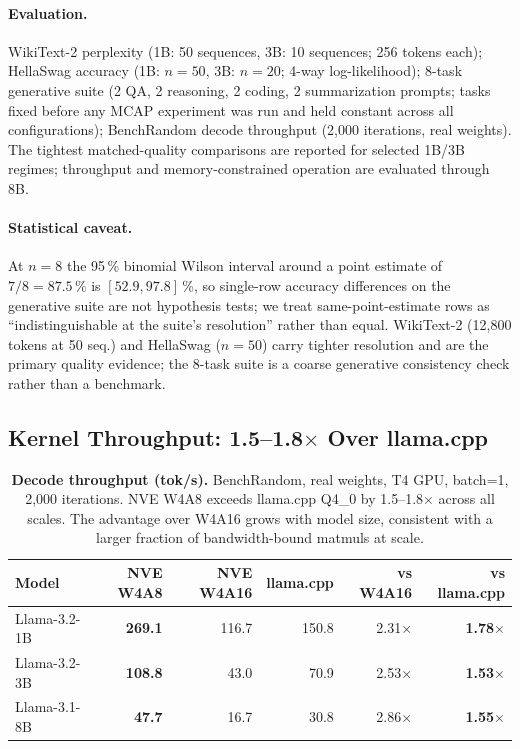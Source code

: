 \documentclass{article}
\begin{document}
\paragraph{Evaluation.}
WikiText-2 perplexity (1B: 50 sequences, 3B: 10 sequences; 256 tokens each);
HellaSwag accuracy (1B: $n=50$, 3B: $n=20$; 4-way log-likelihood);
8-task generative suite (2 QA, 2 reasoning, 2 coding, 2 summarization prompts; tasks
fixed before any MCAP experiment was run and held constant across all configurations);
BenchRandom decode throughput (2,000 iterations, real weights). The tightest
matched-quality comparisons are reported for selected 1B/3B regimes; throughput
and memory-constrained operation are evaluated through 8B.

\paragraph{Statistical caveat.} At $n=8$ the 95\,\% binomial Wilson interval around a
point estimate of $7/8 = 87.5\,\%$ is $[52.9, 97.8]$\,\%, so single-row accuracy
differences on the generative suite are not hypothesis tests; we treat
same-point-estimate rows as ``indistinguishable at the suite's resolution'' rather than
equal. WikiText-2 (12,800 tokens at 50 seq.) and HellaSwag ($n=50$) carry tighter
resolution and are the primary quality evidence; the 8-task suite is a coarse generative
consistency check rather than a benchmark.


\subsection{Kernel Throughput: 1.5--1.8$\times$ Over llama.cpp}
\label{sec:throughput}

\begin{table}[H]
\centering
\caption{\textbf{Decode throughput (tok/s).} BenchRandom, real weights, T4
GPU, batch=1, 2,000 iterations. NVE W4A8 exceeds llama.cpp Q4\_0 by
1.5--1.8$\times$ across all scales. The advantage over W4A16 grows with model
size, consistent with a larger fraction of bandwidth-bound matmuls at scale.}
\label{tab:throughput}
\small
\begin{tabular}{lrrrrr}
\toprule
Model & NVE W4A8 & NVE W4A16 & llama.cpp & vs W4A16 & vs llama.cpp \\
\midrule
Llama-3.2-1B & \textbf{269.1} & 116.7 & 150.8 & 2.31$\times$ & \textbf{1.78$\times$} \\
Llama-3.2-3B & \textbf{108.8} & 43.0 & 70.9 & 2.53$\times$ & \textbf{1.53$\times$} \\
Llama-3.1-8B & \textbf{47.7} & 16.7 & 30.8 & 2.86$\times$ & \textbf{1.55$\times$} \\
\bottomrule
\end{tabular}
\end{table}
\end{document}

